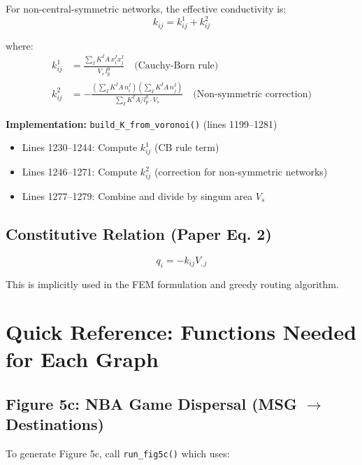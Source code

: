 \documentclass[11pt]{article}
\begin{document}
For non-central-symmetric networks, the effective conductivity is:
\begin{equation}
    k_{ij} = k^1_{ij} + k^2_{ij}
\end{equation}

where:
\begin{align}
    k^1_{ij} &= \frac{\sum_I K^I A \, x^I_i x^I_j}{V_s \, l_p^0} \quad \text{(Cauchy-Born rule)} \\
    k^2_{ij} &= -\frac{\left(\sum_I K^I A \, n^I_i\right) \left(\sum_I K^I A \, n^I_j\right)}{\sum_I K^I A / l_p^0 \cdot V_s} \quad \text{(Non-symmetric correction)}
\end{align}

\textbf{Implementation:} \texttt{build\_K\_from\_voronoi()} (lines 1199--1281)
\begin{itemize}[noitemsep]
    \item Lines 1230--1244: Compute $k^1_{ij}$ (CB rule term)
    \item Lines 1246--1271: Compute $k^2_{ij}$ (correction for non-symmetric networks)
    \item Lines 1277--1279: Combine and divide by singum area $V_s$
\end{itemize}

\subsection{Constitutive Relation (Paper Eq. 2)}

\begin{equation}
    q_i = -k_{ij} V_{,j}
\end{equation}

This is implicitly used in the FEM formulation and greedy routing algorithm.

\section{Quick Reference: Functions Needed for Each Graph}

\subsection{Figure 5c: NBA Game Dispersal (MSG $\to$ Destinations)}

To generate Figure 5c, call \texttt{run\_fig5c()} which uses:
\end{document}
